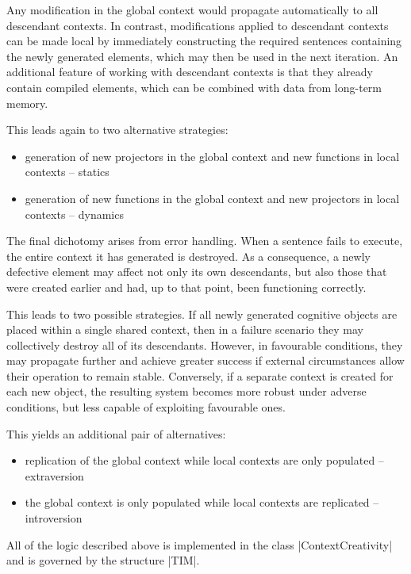\documentclass[12pt, a4paper]{article}
\begin{document}
Any modification in the global context would propagate automatically to all descendant contexts. 
In contrast, modifications applied to descendant contexts can be made local by immediately 
constructing the required sentences containing the newly generated elements, which may then be 
used in the next iteration. An additional feature of working with descendant contexts is that 
they already contain compiled elements, which can be combined with data from long-term memory.

This leads again to two alternative strategies:

\begin{itemize}
\item generation of new projectors in the global context and new functions in local 
contexts -- statics
\item generation of new functions in the global context and new projectors in local 
contexts -- dynamics
\end{itemize}


The final dichotomy arises from error handling. When a sentence fails to execute, the 
entire context it has generated is destroyed. As a consequence, a newly defective element 
may affect not only its own descendants, but also those that were created earlier and had, 
up to that point, been functioning correctly.

This leads to two possible strategies. If all newly generated cognitive objects are 
placed within a single shared context, then in a failure scenario they may collectively 
destroy all of its descendants. However, in favourable conditions, they may propagate 
further and achieve greater success if external circumstances allow their operation to 
remain stable. Conversely, if a separate context is created for each new object, the 
resulting system becomes more robust under adverse conditions, but less capable of 
exploiting favourable ones.

This yields an additional pair of alternatives:

\begin{itemize}
\item replication of the global context while local contexts are only populated -- extraversion
\item the global context is only populated while local contexts are replicated -- introversion
\end{itemize}

All of the logic described above is implemented in the class |ContextCreativity| and is 
governed by the structure |TIM|.
\end{document}
